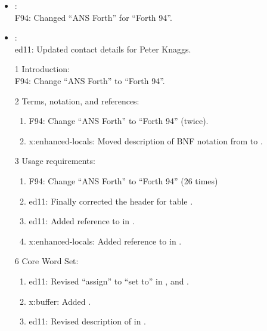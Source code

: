 	\begin{itemize}
	\item {}: \\						%
		\textsf{F94}: Changed ``ANS Forth'' for ``Forth 94''.

	\item {}: \\						%
		\textsf{ed11}: Updated contact details for Peter Knaggs.

	\item[1] Introduction: \\						%
		\textsf{F94}: Change ``ANS Forth'' to ``Forth 94''.
	
	\item[2] Terms, notation, and references:	%
		\begin{enumerate}
		\item \textsf{F94}: Change ``ANS Forth'' to ``Forth 94'' (twice).
		\item \textsf{x:enhanced-locals}: Moved description of BNF notation from
			 to .
		\end{enumerate}

	\item[3] Usage requirements:					%
		\begin{enumerate}
		\item \textsf{F94}: Change ``ANS Forth'' to ``Forth 94''
			(26 times)
		\item \textsf{ed11}: Finally corrected the header for table .
		\item \textsf{ed11}: Added reference to  in .
		\item \textsf{x:enhanced-locals}: Added reference to  in .
		\end{enumerate}

	\item[6] Core Word Set:							%
		\begin{enumerate}
		\item \textsf{ed11}: Revised ``assign'' to ``set to'' in
			,
			 and
			.
		\item \textsf{x:buffer}: Added .
		\item \textsf{ed11}: Revised description of \texttt{} in .
		\end{enumerate}


\end{itemize}

